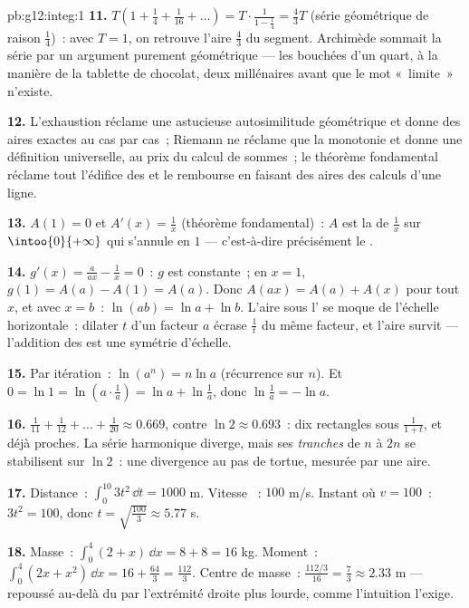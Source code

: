 \begin{solution}{pb:g12:integ:1}
\textbf{11.} $T\left(1 + \frac14 + \frac{1}{16} + \dots\right)
= T \cdot \frac{1}{1 - \frac14} = \frac43 T$ (série géométrique de
raison $\frac14$)~: avec $T = 1$, on retrouve l'aire $\frac43$ du
segment. Archimède sommait la série par un argument purement
géométrique --- les bouchées d'un quart, à la manière de la tablette
de chocolat, deux millénaires avant que le mot «~limite~» n'existe.

\textbf{12.} L'exhaustion réclame une astucieuse autosimilitude
géométrique et donne des aires exactes au cas par cas~; Riemann ne
réclame que la monotonie et donne une définition universelle, au
prix du calcul de sommes~; le théorème fondamental réclame tout
l'édifice des  et le rembourse en faisant des aires des
calculs d'une ligne.

\textbf{13.} $A(1) = 0$ et $A'(x) = \frac1x$ (théorème
fondamental)~: $A$ est la  de $\frac1x$ sur
$\intoo{0}{+\infty}$ qui s'annule en $1$ --- c'est-à-dire
précisément le .

\textbf{14.} $g'(x) = \frac{a}{ax} - \frac1x = 0$~: $g$ est
constante~; en $x = 1$, $g(1) = A(a) - A(1) = A(a)$. Donc
$A(ax) = A(a) + A(x)$ pour tout $x$, et avec $x = b$~:
$\ln(ab) = \ln a + \ln b$. L'aire sous l' se moque de
l'échelle horizontale~: dilater $t$ d'un facteur $a$ écrase
$\frac1t$ du même facteur, et l'aire survit --- l'addition des
 est une symétrie d'échelle.

\textbf{15.} Par itération~: $\ln(a^n) = n\ln a$ (récurrence sur
$n$). Et $0 = \ln 1 = \ln\left(a \cdot \frac1a\right) =
\ln a + \ln\frac1a$, donc $\ln\frac1a = -\ln a$.

\textbf{16.} $\frac{1}{11} + \frac{1}{12} + \dots +
\frac{1}{20} \approx 0.669$, contre $\ln 2 \approx 0.693$~: dix
rectangles sous $\frac{1}{1+t}$, et déjà proches. La série
harmonique diverge, mais ses \emph{tranches} de $n$ à $2n$ se
stabilisent sur $\ln 2$~: une divergence au pas de tortue, mesurée
par une aire.

\textbf{17.} Distance~: $\int_0^{10} 3t^2\,\dd t = 1000$ m. Vitesse
~: $100$ m/s. Instant où $v = 100$~: $3t^2 = 100$, donc
$t = \sqrt{\frac{100}{3}} \approx 5.77$ s.

\textbf{18.} Masse~: $\int_0^4 (2 + x)\,\dd x = 8 + 8 = 16$ kg.
Moment~: $\int_0^4 (2x + x^2)\,\dd x = 16 + \frac{64}{3} =
\frac{112}{3}$. Centre de masse~:
$\frac{112/3}{16} = \frac73 \approx 2.33$ m --- repoussé au-delà du
 par l'extrémité droite plus lourde, comme l'intuition
l'exige.


\end{solution}
